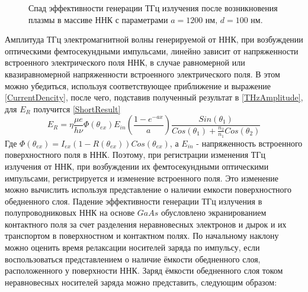 \documentclass[a4paper,14pt,russian]{extreport}
\begin{document}
				\begin{figure}[H]
					\caption{Спад эффективности генерации ТГц излучения после возникновения плазмы в массиве ННК с параметрами $a = 1200 \text{ нм, } d = 100 \text{ нм}$.}
				\label{ris:short1200100}
				\end{figure}
				Амплитуда ТГц электромагнитной волны генерируемой от ННК, при возбуждении оптическими фемтосекундными импульсами, линейно зависит от напряженности встроенного электрического поля ННК, в случае равномерной или квазиравномерной напряженности встроенного электрического поля. В этом можно убедиться, используя соответствующее приближение и выражение \ref{CurrentDencity}, после чего, подставив полученный результат в \ref{THzAmplitude}, для $E_R$ получится \ref{ShortResult}
				\begin{equation}\label{ShortResult}
					E_R = \eta \frac{\mu e}{h \nu}\Phi(\theta_{ex}) E_{in} \left( \frac{1-e^{-a x}}{a} \right) \frac{Sin(\theta_1)}{Cos(\theta_1)+\frac{n_2}{n_1}Cos(\theta_2)}
				\end{equation}
				Где $\Phi(\theta_{ex}) = I_{ex}(1-R(\theta_{ex}))Cos(\theta_{ex})$, а $E_{in}$ - напряженность встроенного поверхностного поля в ННК. Поэтому, при регистрации изменения ТГц излучения от ННК, при возбуждении их фемтосекундными оптическими импульсами, регистрируется и изменение встроенного поля. Это изменение можно вычислить используя представление о наличии емкости поверхностного обедненного слоя. Падение эффективности генерации ТГц излучения в полупроводниковых ННК на основе $GaAs$ обусловлено экранированием контактного поля за счет разделения неравновесных электронов и дырок и их транспортом в поверхностном и контактном полях. По начальному наклону можно оценить время релаксации носителей заряда по импульсу, если воспользоваться представлением о наличие ёмкости обедненного слоя, расположенного у поверхности ННК. Заряд ёмкости обедненного слоя током неравновесных носителей заряда можно представить, следующим образом:
\end{document}
